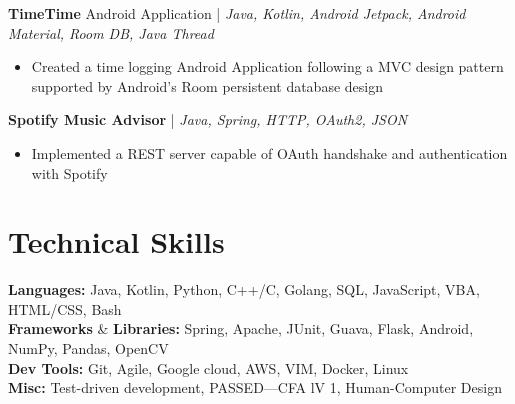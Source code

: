 \documentclass[12pt, letterpaper]{article}
\begin{document}
\textbf{TimeTime} Android Application | \small\textit{Java, Kotlin, Android Jetpack, Android Material, Room DB, Java Thread}
\begin{itemize}[noitemsep,topsep=0pt]
  \item Created a time logging Android Application following a MVC design pattern supported by Android's Room persistent database design
\end{itemize}

\textbf{Spotify Music Advisor} | \small\textit{Java, Spring, HTTP, OAuth2, JSON}
\begin{itemize}[noitemsep,topsep=0pt]
  \item Implemented a REST server capable of OAuth handshake and authentication with Spotify
\end{itemize}

\section{Technical Skills}
\textbf{Languages:} Java, Kotlin, Python, C++/C, Golang, SQL, JavaScript, VBA, HTML/CSS, Bash \\
\textbf{Frameworks} \& \textbf{Libraries:} Spring, Apache, JUnit, Guava, Flask, Android, NumPy, Pandas, OpenCV \\
\textbf{Dev Tools:} Git, Agile, Google cloud, AWS, VIM, Docker, Linux \\
\textbf{Misc:} Test-driven development, PASSED---CFA lV 1, Human-Computer Design
\end{document}
